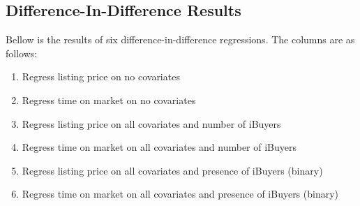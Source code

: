 \clearpage

\subsection{Difference-In-Difference Results}

Bellow is the results of six difference-in-difference regressions. The columns are as follows:

\begin{enumerate}

    \item Regress listing price on no covariates

    \item Regress time on market on no covariates

    \item Regress listing price on all covariates and number of iBuyers

    \item Regress time on market  on all covariates and number of iBuyers

    \item Regress listing price on all covariates and presence of iBuyers (binary)

    \item Regress time on market on all covariates and presence of iBuyers (binary)

\end{enumerate}


